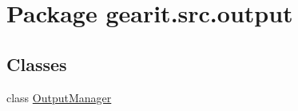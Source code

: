 \hypertarget{namespacegearit_1_1src_1_1output}{\section{Package gearit.\+src.\+output}
\label{namespacegearit_1_1src_1_1output}
}
\subsection*{Classes}
\begin{DoxyCompactItemize}
\item 
class \hyperlink{classgearit_1_1src_1_1output_1_1_output_manager}{Output\+Manager}
\end{DoxyCompactItemize}

